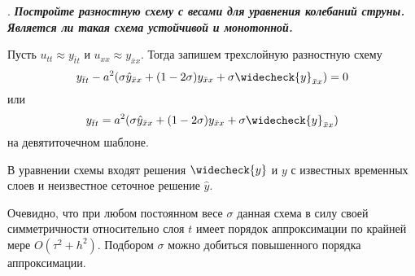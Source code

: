 \documentclass[12pt, a4paper]{article}
\newcounter{mycounter}
\newcommand{\quastion}[1]{%
	\stepcounter{mycounter}%
	\textbf{\themycounter}.  %
	\textbf{\textit{#1}}
	
}
\begin{document}
	\quastion{Постройте разностную схему с весами для уравнения колебаний струны. Является ли такая схема устойчивой и монотонной.}
	
	Пусть $u_{tt} \approx y_{\bar{t}t} $ и $u_{xx} \approx y_{\bar{x}x} $. Тогда запишем трехслойную разностную схему
	\begin{equation}
		y_{\bar{t}t} - a^2 (\sigma \hat{y}_{\bar{x}x} + (1 - 2 \sigma) y_{\bar{x}x} + \sigma \widecheck{y}_{\bar{x}x}) = 0
	\end{equation}
	или
	\begin{equation*}
		y_{\bar{t}t} = a^2 (\sigma \hat{y}_{\bar{x}x} + (1 - 2 \sigma) y_{\bar{x}x} + \sigma \widecheck{y}_{\bar{x}x})
	\end{equation*}
	на девятиточечном шаблоне. 
	
	В уравнении схемы входят решения $\widecheck{y}$ и $y$ с известных временных слоев и неизвестное сеточное решение $\hat{y}$.
	
	Очевидно, что при любом постоянном весе $\sigma$ данная схема в силу своей симметричности относительно слоя $t$ имеет порядок аппроксимации по крайней мере $O(\tau^2 + h^2)$. Подбором $\sigma$ можно добиться повышенного порядка аппроксимации. 
	
\end{document}
